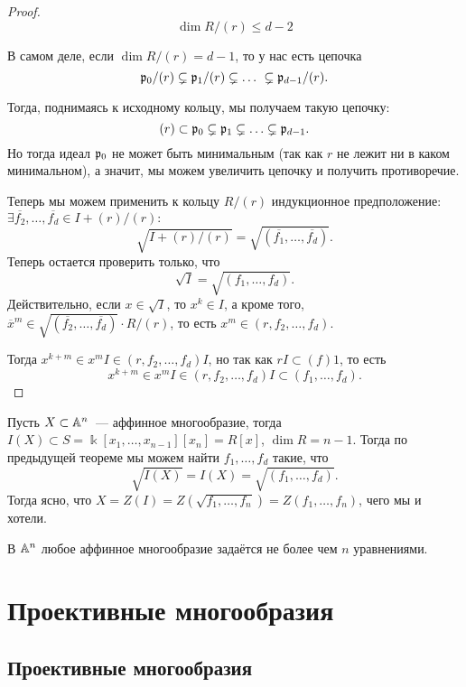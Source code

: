 \begin{proof}
  		\[
  			\dim{R/(r)} \le d - 2 
  		\]

  		В самом деле, если $\dim{R/(r)} = d - 1$, то у нас есть цепочка 
  		\[
  			\fp_0/(r) \subsetneq \fp_1/(r) \subsetneq  \ldots \ \subsetneq \fp_{d - 1}/(r). 
  		\]

  		Тогда, поднимаясь к исходному кольцу, мы получаем такую цепочку: 
  		\[
  			(r) \subset \fp_0 \subsetneq \fp_1 \subsetneq \ldots \subsetneq \fp_{d - 1}.
  		\]
  		Но тогда идеал $\fp_0$ не может быть минимальным (так как $r$ не лежит ни в каком минимальном), а значит, мы можем увеличить цепочку и получить противоречие. 

  		Теперь мы можем применить к кольцу $R/(r)$ индукционное предположение: $\exists \overline{f_2}, \ldots, \overline{f_d} \in I + (r)/(r)\colon$
  		\[
  			\sqrt{I + (r)/(r)} = \sqrt{(\overline{f_1}, \ldots, \overline{f_d})}.
  		\]
 		Теперь остается проверить только, что 
 		\[
 			\sqrt{I} = \sqrt{(f_1, \ldots, f_d)}.
 		\]
 		Действительно, если $x \in \sqrt{I}$, то $x^k \in I$, а кроме того, $\overline{x}^m \in \sqrt{(\overline{f_2}, \ldots, \overline{f_d})} \cdot R/(r)$, то есть $x^m \in (r, f_2, \ldots, f_d)$.

 		Тогда $x^{k + m} \in x^m I \in (r, f_2, \ldots, f_d)I$, но так как $rI \subset (f)1$, то есть 
 		\[
 			x^{k + m} \in x^m I \in (r, f_2, \ldots, f_d)I \subset (f_1, \ldots, f_d). 
 		\]

 	\end{proof}

 	Пусть $X \subset \AA^n$~--- аффинное многообразие, тогда $I(X) \subset S = \Bbbk[x_1, \ldots, x_{n - 1}][x_n] = R[x]$, $\dim{R} = n - 1$. Тогда по предыдущей теореме мы можем найти $f_1, \ldots, f_d$ такие, что 
 	\[
 		\sqrt{I(X)} = I(X) = \sqrt{(f_1, \ldots, f_d)}. 
 	\]
 	Тогда ясно, что $X = Z(I) = Z(\sqrt{f_1, \ldots, f_n}) = Z(f_1, \ldots, f_n)$, чего мы и хотели. 

 	\begin{corollary}
 		В $\AA^n$ любое аффинное многообразие задаётся не более чем $n$ уравнениями. 
 	\end{corollary}

    \section{Проективные многообразия}

 	\subsection{Проективные многообразия}

